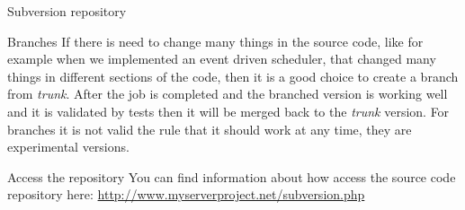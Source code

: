 \documentclass[12pt]{article}
\begin{document}
\begin{section}{Subversion repository}
\begin{subsection}{Branches}
If there is need to change many things in the source code, like for
example when we implemented an event driven scheduler, that changed
many things in different sections of the code, then it is a good
choice to create a branch from \textit{trunk}.
After the job is completed and the branched version is working well
and it is validated by tests then it will be merged back to the
\textit{trunk} version.
For branches it is not valid the rule that it should work at any time,
they are experimental versions.
\end{subsection}

\begin{subsection}{Access the repository}
You can find information about how access the source code repository here:
\url{http://www.myserverproject.net/subversion.php}
\end{subsection}
\end{section}
\end{document}

